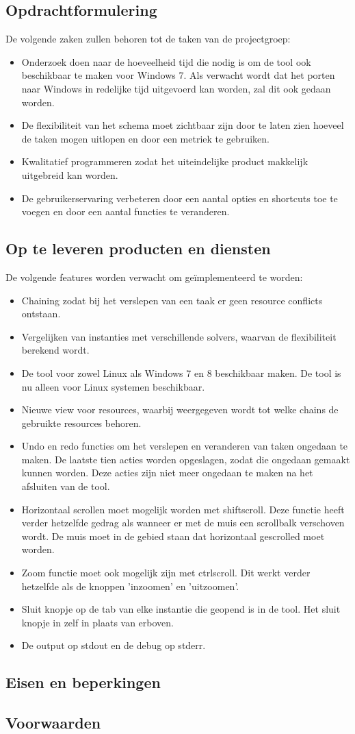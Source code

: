 \subsection{Opdrachtformulering}
De volgende zaken zullen behoren tot de taken van de projectgroep:
\begin{itemize}
	\item Onderzoek doen naar de hoeveelheid tijd die nodig is om de tool ook beschikbaar te maken voor Windows 7. Als verwacht wordt dat het porten naar Windows in redelijke tijd uitgevoerd kan worden, zal dit ook gedaan worden. 
	\item De flexibiliteit van het schema moet zichtbaar zijn door te laten zien hoeveel de taken mogen uitlopen en door een metriek te gebruiken.
	\item Kwalitatief programmeren zodat het uiteindelijke product makkelijk uitgebreid kan worden.
	\item De gebruikerservaring verbeteren door een aantal opties en shortcuts toe te voegen en door een aantal functies te veranderen.
\end{itemize}

\subsection{Op te leveren producten en diensten}
De volgende features worden verwacht om ge\"implementeerd te worden:
\begin{itemize}
	\item Chaining zodat bij het verslepen van een taak er geen resource conflicts ontstaan.
	\item Vergelijken van instanties met verschillende solvers, waarvan de flexibiliteit berekend wordt.
	\item De tool voor zowel Linux als Windows 7 en 8 beschikbaar maken. De tool is nu alleen voor Linux systemen beschikbaar. 
	\item Nieuwe view voor resources, waarbij weergegeven wordt tot welke chains de gebruikte resources behoren.
	\item Undo en redo functies om het verslepen en veranderen van taken ongedaan te maken. De laatste tien acties worden opgeslagen, zodat die ongedaan gemaakt kunnen worden. Deze acties zijn niet meer ongedaan te maken na het afsluiten van de tool. 
	\item Horizontaal scrollen moet mogelijk worden met shift\plus scroll. Deze functie heeft verder hetzelfde gedrag als wanneer er met de muis een scrollbalk verschoven wordt. De muis moet in de gebied staan dat horizontaal gescrolled moet worden. 
	\item Zoom functie moet ook mogelijk zijn met ctrl\plus scroll. Dit werkt verder hetzelfde als de knoppen 'inzoomen' en 'uitzoomen'.
	\item Sluit knopje op de tab van elke instantie die geopend is in de tool. Het sluit knopje in  zelf in plaats van erboven.
	\item De output op stdout en de debug op stderr.
\end{itemize}

\subsection{Eisen en beperkingen}
\subsection{Voorwaarden}
